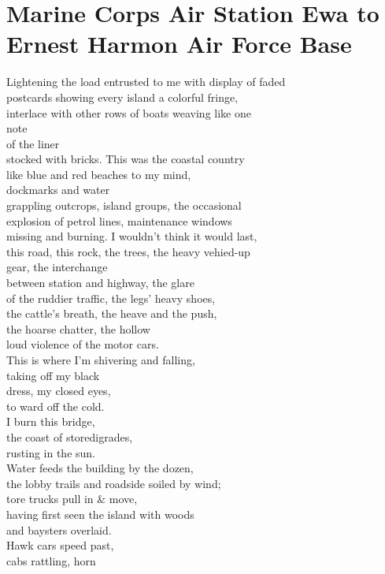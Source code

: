 \documentclass[smalldemyvopaper,11pt,twoside,onecolumn,openright,extrafontsizes]{memoir}
\begin{document}
\chapter{Marine Corps Air Station Ewa to Ernest Harmon Air Force Base}
Lightening the load entrusted to me with display of faded
\\postcards showing every island a colorful fringe,
\\interlace with other rows of boats weaving like one
\\note
\\of the liner
\\stocked with bricks. This was the coastal country
\\like blue and red beaches to my mind,
\\dockmarks and water
\\grappling outcrops, island groups, the occasional
\\explosion of petrol lines, maintenance windows
\\missing and burning. I wouldn't think it would last,
\\this road, this rock, the trees, the heavy vehied-up
\\gear, the interchange
\\between station and highway, the glare
\\of the ruddier traffic, the legs' heavy shoes,
\\the cattle's breath, the heave and the push,
\\the hoarse chatter, the hollow
\\loud violence of the motor cars.
\\This is where I'm shivering and falling,
\\taking off my black
\\dress, my closed eyes,
\\to ward off the cold.
\\I burn this bridge,
\\the coast of storedigrades,
\\rusting in the sun.
\\Water feeds the building by the dozen,
\\the lobby trails and roadside soiled by wind;
\\tore trucks pull in \& move,
\\having first seen the island with woods
\\and baysters overlaid.
\\Hawk cars speed past,
\\cabs rattling, horn
\end{document}
